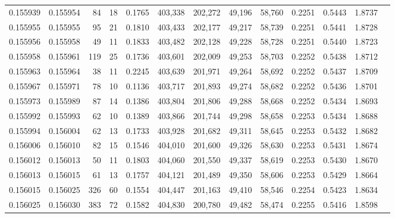 \begin{tabular}{rrrrrrrrrrrrr}
0.155939 & 0.155954 &    84 &  18 &                                     0.1765 & 403,338 & 202,272 &  49,196 &  58,760 & 0.2251 & 0.5443 & 1.8737 \\
0.155955 & 0.155955 &    95 &  21 &                                     0.1810 & 403,433 & 202,177 &  49,217 &  58,739 & 0.2251 & 0.5441 & 1.8728 \\
0.155956 & 0.155958 &    49 &  11 &                                     0.1833 & 403,482 & 202,128 &  49,228 &  58,728 & 0.2251 & 0.5440 & 1.8723 \\
0.155958 & 0.155961 &   119 &  25 &                                     0.1736 & 403,601 & 202,009 &  49,253 &  58,703 & 0.2252 & 0.5438 & 1.8712 \\
0.155963 & 0.155964 &    38 &  11 &                                     0.2245 & 403,639 & 201,971 &  49,264 &  58,692 & 0.2252 & 0.5437 & 1.8709 \\
0.155967 & 0.155971 &    78 &  10 &                                     0.1136 & 403,717 & 201,893 &  49,274 &  58,682 & 0.2252 & 0.5436 & 1.8701 \\
0.155973 & 0.155989 &    87 &  14 &                                     0.1386 & 403,804 & 201,806 &  49,288 &  58,668 & 0.2252 & 0.5434 & 1.8693 \\
0.155992 & 0.155993 &    62 &  10 &                                     0.1389 & 403,866 & 201,744 &  49,298 &  58,658 & 0.2253 & 0.5434 & 1.8688 \\
0.155994 & 0.156004 &    62 &  13 &                                     0.1733 & 403,928 & 201,682 &  49,311 &  58,645 & 0.2253 & 0.5432 & 1.8682 \\
0.156006 & 0.156010 &    82 &  15 &                                     0.1546 & 404,010 & 201,600 &  49,326 &  58,630 & 0.2253 & 0.5431 & 1.8674 \\
0.156012 & 0.156013 &    50 &  11 &                                     0.1803 & 404,060 & 201,550 &  49,337 &  58,619 & 0.2253 & 0.5430 & 1.8670 \\
0.156013 & 0.156015 &    61 &  13 &                                     0.1757 & 404,121 & 201,489 &  49,350 &  58,606 & 0.2253 & 0.5429 & 1.8664 \\
0.156015 & 0.156025 &   326 &  60 &                                     0.1554 & 404,447 & 201,163 &  49,410 &  58,546 & 0.2254 & 0.5423 & 1.8634 \\
0.156025 & 0.156030 &   383 &  72 &                                     0.1582 & 404,830 & 200,780 &  49,482 &  58,474 & 0.2255 & 0.5416 & 1.8598 \\

\end{tabular}
